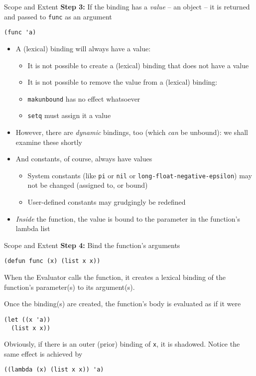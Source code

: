 \documentclass[presentation]{beamer}
\begin{document}
\begin{frame}[fragile]{Scope and Extent}
\textbf{Step 3:} If the binding has a \emph{value} -- an object -- it is returned and passed to \texttt{func} as an argument
\begin{verbatim}
(func 'a)
\end{verbatim}
\begin{itemize}
\item A (lexical) binding will always have a value: 
  \begin{itemize}
  \item It is not possible to create a (lexical) binding that does not have a value
  \item It is not possible to remove the value from a (lexical) binding:
  \item \texttt{makunbound} has no effect whatsoever
  \item \texttt{setq} must assign it a value
  \end{itemize}
\item However, there are \emph{dynamic} bindings, too (which \emph{can} be unbound): we shall examine these shortly
\item And constants, of course, always have values
  \begin{itemize}
  \item System constants (like \texttt{pi} or \texttt{nil} or \texttt{long-float-negative-epsilon}) may not be changed (assigned to, or bound)
  \item User-defined constants may grudgingly be redefined
  \end{itemize}
\item \emph{Inside} the function, the value is bound to the parameter in the function's lambda list
\end{itemize}

\end{frame}

\begin{frame}[fragile]{Scope and Extent}
\textbf{Step 4:} Bind the function's arguments
\begin{verbatim}
(defun func (x) (list x x))
\end{verbatim}

When the Evaluator calls the function, it creates a lexical binding of the function's parameter(s) to its argument(s).

Once the binding(s) are created, the function's body is evaluated as if it were

\begin{verbatim}
(let ((x 'a))
  (list x x))
\end{verbatim}

Obviously, if there is an outer (prior) binding of \texttt{x}, it is shadowed.  Notice the same effect is achieved by

\begin{verbatim}
((lambda (x) (list x x)) 'a)
\end{verbatim}

\end{frame}
\end{document}
